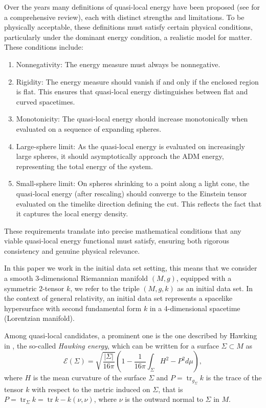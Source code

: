 \documentclass[12pt,a4paper]{amsart}
\theoremstyle{plain}
\theoremstyle{definition}
\newcommand{\tr}{\operatorname{tr}}
\begin{document}
Over the years many definitions of quasi-local energy have been proposed (see \cite{Living} for a comprehensive review), each with distinct strengths and limitations. To be physically acceptable, these definitions must satisfy certain physical conditions, particularly under the dominant energy condition, a realistic model for matter. These conditions include:
\begin{enumerate}[label=(\arabic*), ref=(\arabic*)]
    \item\label{item:nonneg}  Nonnegativity: The energy measure must always be nonnegative.

     \item\label{item:rigidity} Rigidity: The energy measure should vanish if and only if the enclosed region is flat. This ensures that quasi-local energy distinguishes between flat and curved spacetimes. 

     \item\label{item:monotone} Monotonicity: The quasi-local energy should increase monotonically when evaluated on a sequence of expanding spheres.

    \item\label{item:large} Large-sphere limit:  As the quasi-local energy is evaluated on increasingly large spheres, it should asymptotically approach the ADM energy, representing the total energy of the system. 

    \item\label{item:small} Small-sphere limit:  On spheres shrinking to a point along a light cone, the quasi‐local energy (after rescaling) should converge to the Einstein tensor evaluated on the  timelike direction defining the cut. This reflects the fact that it captures the local energy density.
\end{enumerate}

These requirements translate into precise mathematical conditions that any viable quasi-local energy functional must satisfy, ensuring both rigorous consistency and genuine physical relevance.

In this paper we work in the initial data set setting, this means that we consider a smooth $3$-dimensional Riemannian manifold $(M,g)$, equipped with a symmetric $2$-tensor $k$, we refer to the triple $(M,g,k)$ as an initial data set. In the context of general relativity, an initial data set represents a spacelike hypersurface with second fundamental form $k$ in a 4-dimensional spacetime (Lorentzian manifold).


Among quasi-local candidates, a prominent one is the one described by Hawking in \cite{Hawma}, the so-called \emph{Hawking energy},  which can be written for a surface $\Sigma \subset M $ as
\begin{equation}\label{hawkingmass2.intro}
    \mathcal{E}(\Sigma) = \sqrt{\frac{|\Sigma|}{16 \pi}} \left( 1- \frac{1}{16 \pi} \int_\Sigma H^2 - P^2 d\mu \right),
\end{equation}
where $H$ is the mean curvature of the surface $\Sigma$ and   $P=\tr_{g_{\Sigma}} k$ is the trace of the tensor $k$ with respect to the metric induced on $\Sigma$, that is  $P= \tr_\Sigma k= \tr k -k(\nu,\nu)$, where $\nu$ is the outward  normal to $\Sigma$ in $M$. 
\end{document}
